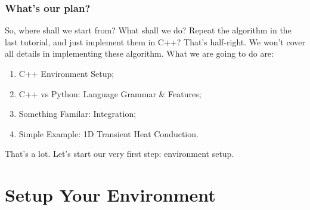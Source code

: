 \documentclass[compress,xcolor={dvipsnames}]{beamer}
\begin{document}
\begin{frame}
    \frametitle{What's our plan?}
    So, where shall we start from? What shall we do? Repeat the algorithm in the last tutorial, and just implement them in C++?
    \bigbreak
    \pause
    That's half-right. We won't cover all details in implementing these algorithm. What we are going to do are:
    \begin{enumerate}
        \item C++ Environment Setup;
        \item C++ vs Python: Language Grammar \&  Features;
        \item Something Familar: Integration;
        \item Simple Example: 1D Transient Heat Conduction.
    \end{enumerate}
    \pause
    That's a lot. Let's start our very first step: environment setup.
\end{frame}

\section{Setup Your Environment}
\end{document}
